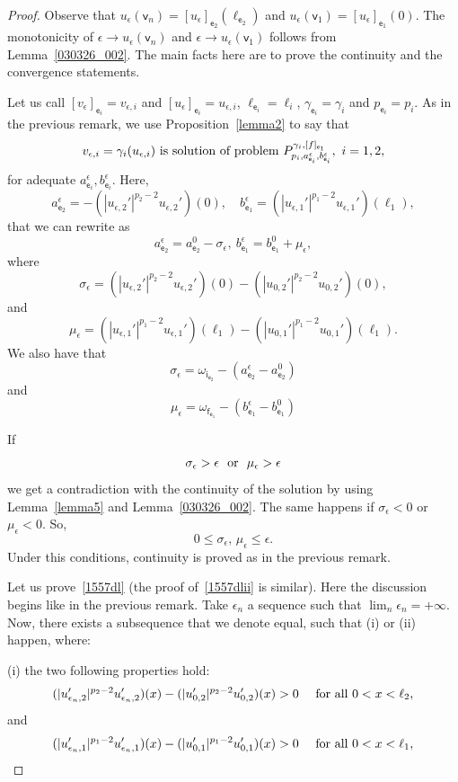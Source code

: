 \documentclass[reqno,12pt]{amsart}
\def\e{\mathsf{e}} 	%
\def\v{\mathsf{v}}	%
\newcommand{\vi}{\mathsf{i}} %
\newcommand{\vf}{\mathsf{f}} %
\numberwithin{equation}{section} %
\begin{document}
\begin{proof} Observe that $u_\epsilon(\v_n)= [u_\epsilon]_{\e_2}(\ell_{\e_2})$ and
$u_\epsilon(\v_1)=[u_\epsilon]_{\e_1}(0)$. The monotonicity of  $\epsilon\to u_\epsilon(\v_n)$ and $\epsilon\to u_\epsilon(\v_1)$ follows from Lemma~\ref{030326_002}. The main facts here are to prove  the continuity  and the convergence statements. 

 Let us call $[v_\epsilon]_{\e_i}=v_{\epsilon,i}$ and $[u_\epsilon]_{\e_i}=u_{\epsilon,i}$, $\ell_{\e_i}=\ell_i$, $\gamma_{\e_i}=\gamma_i$ and $p_{\e_i}=p_i$. As in the previous remark,  we use  Proposition~\ref{lemma2} to say that
$$v_{\epsilon,i}=\gamma_{i}(u_{\epsilon,i})  \ \hbox{is solution of problem} \ P^{\gamma_i, [f]_{\e_1}}_{ p_i, a_{\e_i}^\epsilon,b_{\e_i}^\epsilon} , \ i= 1,2,$$  for adequate $a_{\e_i}^\epsilon,b_{\e_i}^\epsilon$. Here,
$$  a_{\e_2}^\epsilon= -(|u_{\epsilon,2}'|^{p_2-2}u_{\epsilon,2}')(0), \quad  b_{\e_1}^\epsilon= (|u_{\epsilon,1}'|^{p_1-2}u_{\epsilon,1}')(\ell_{1}),$$
that we can rewrite as
$$a_{\e_2}^\epsilon=a_{\e_2}^0-\sigma_\epsilon,\ b_{\e_1}^\epsilon=b_{\e_1}^0+\mu_\epsilon,$$
where
$$\sigma_\epsilon=  (|u_{\epsilon,2}'|^{p_{2}-2}u_{\epsilon,2}')(0)
 -(|u_{0,2}'|^{p_{2}-2}u_{0,2}')(0),$$
 and
$$\mu_\epsilon=  (|u_{\epsilon,1}'|^{p_{1}-2}u_{\epsilon,1}')(\ell_{1})- (|u_{0,1}'|^{p_{1}-2}u_{0,1}')(\ell_{1}).$$
We also have that
$$\sigma_\epsilon= \omega_{\vi_{\e_2}}-(a_{\e_2}^\epsilon-a_{\e_2}^0)$$
and
$$\mu_\epsilon= \omega_{\vf_{\e_1}}-(b_{\e_1}^\epsilon-b_{\e_1}^0)$$

If $$\sigma_\epsilon>\epsilon \ \hbox{ or }\  \mu_\epsilon>\epsilon$$
we get a contradiction with  the continuity of the solution by using Lemma~\ref{lemma5} and  Lemma~\ref{030326_002}.  The same happens if $\sigma_\epsilon<0$ or $\mu_\epsilon<0$. So,
$$0\le \sigma_\epsilon,\, \mu_\epsilon\le \epsilon.$$
Under this conditions, continuity is proved as in the previous remark.

 
 

  Let us  prove~\eqref{1557dl} (the proof of~\eqref{1557dlii}  is similar). Here the discussion begins like in the previous remark.
Take $\epsilon_n$ a sequence such that $\lim_n\epsilon_n=+\infty$. Now, there exists a subsequence that we denote equal,  such that (i) or (ii) happen, where:

\noindent (i) the two following properties hold:
$$(|u_{\epsilon_n,2}'|^{p_{2}-2}u_{\epsilon_n,2}')(x)
 -(|u_{0,2}'|^{p_{2}-2}u_{0,2}')(x)>0\quad\hbox{ for all } 0<x<\ell_2,$$
and
$$(|u_{\epsilon_n,1}'|^{p_{1}-2}u_{\epsilon_n,1}')(x)
 -(|u_{0,1}'|^{p_{1}-2}u_{0,1}')(x)>0\quad\hbox{ for all } 0<x<\ell_1,$$




\end{proof}
\end{document}
